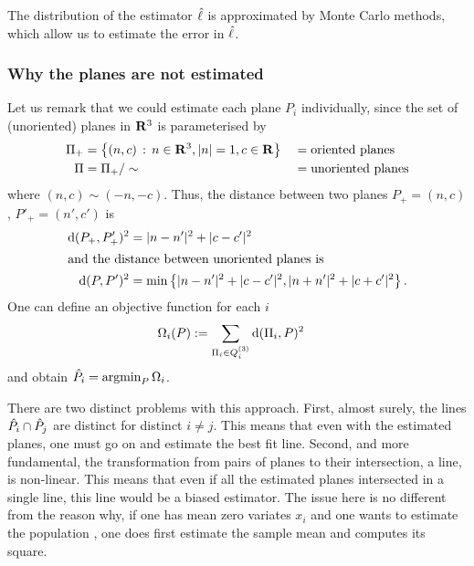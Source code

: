 \documentclass[a4paper,reqno]{amsart}
\begin{document}
The distribution of the estimator $\hat{\ell}$ is approximated by
Monte Carlo methods, which allow us to estimate the error in
$\hat{\ell}$.

\subsubsection{Why the planes are not estimated}
\label{sec:why-no-planes}

Let us remark that we could estimate each plane $P_i$ individually,
since the set of (unoriented) planes in ${\mathbf R}^3$ is parameterised by
\begin{align}
  \label{eq:planes-in-r3}
  \Pi_+ &= \left\{ (n,c) \,:\, n\in{\mathbf R}^3,|n|=1, c\in{\mathbf R} \right\}
  &&=\textrm{oriented planes}\\
  \Pi &= \Pi_+/\sim
  &&=\textrm{unoriented planes}
\end{align}
where $(n,c) \sim (-n,-c)$. Thus, the distance between two planes
$P_+=(n,c)$, $P'_+=(n',c')$ is
\begin{align}
  \label{eq:dplane}
  {\mathrm d}(P_+,P'_+)^2 &= |n-n'|^2 + |c-c'|^2\\
\intertext{and the distance between unoriented planes is}
  {\mathrm d}(P,P')^2 &= \min\left\{ |n-n'|^2 + |c-c'|^2,  |n+n'|^2
    + |c+c'|^2 \right\}.
\end{align}
One can define an objective function for each $i$
\begin{align}
  \label{eq:plane-objectivefn}
  \Omega_i(P) &:= \sum_{\Pi_i \in Q_i^{(3)}} {\mathrm d}(\Pi_i,P)^2
\end{align}
and obtain $\hat{P}_i={\displaystyle\mathrm{argmin}_{P}\,\Omega_i}$.

There are two distinct problems with this approach. First, almost
surely, the lines $\hat{P}_i \cap \hat{P}_j$ are distinct
for distinct $i \neq j$. This means that even with the estimated
planes, one must go on and estimate the best fit line. Second, and
more fundamental, the transformation from pairs of planes to their
intersection, a line, is non-linear. This means that even if all the
estimated planes intersected in a single line, this line would be a
biased estimator. The issue here is no different from the reason why,
if one has mean zero variates $x_i$ and one wants to estimate the
population , one does first estimate the sample mean
and computes its square.




\end{document}
